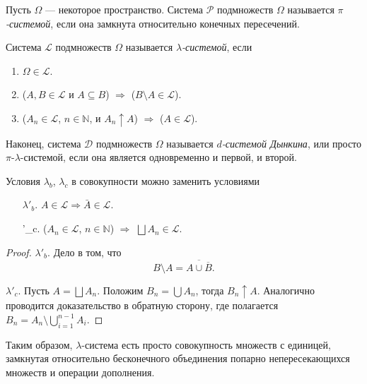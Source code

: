 \begin{definition}
  Пусть $ \Omega $ --- некоторое пространство. Система $ \mathscr P $
  подмножеств $ \Omega $ называется \emph{$ \pi $-системой}, если она замкнута
  относительно конечных пересечений.

  Система $ \mathscr L $ подмножеств $ \Omega $ называется \emph{$ \lambda
  $-системой}, если 
  \begin{enumerate}[label=$ \lambda_\alph* $.]
    \item $ \Omega \in \mathscr L $.
    \item ($ A, B \in \mathscr L $ и $ A \subseteq B $) $ \Rightarrow $ ($ B
      \setminus A \in \mathscr L$).
    \item\label{enum:lam3} ($ A_n \in \mathscr L $, $ n \in \mathbb N $, и $ A_n \uparrow A $) $
      \Rightarrow $ ($ A \in \mathscr L $).
  \end{enumerate}

  Наконец, система $ \mathscr D $ подмножеств $ \Omega $ называется \emph{$ d
  $-системой Дынкина}, или просто $ \pi $-$ \lambda $-системой, если она
  является одновременно и первой, и второй.
\end{definition}
\begin{remark*}
  Условия $ \lambda_b $, $ \lambda_c $ в совокупности можно заменить
  условиями
  \begin{enumerate}
    \item[$ \lambda'_b. $]\label{enum:lam2bis} $ A \in \mathscr L \Rightarrow \bar A\in\mathscr L $.
    \item[\lambda'_c.] ($ A_n \in \mathscr L $, $ n\in\mathbb N $) $ \Rightarrow
      $ $ \bigsqcup A_n \in \mathscr L $.
  \end{enumerate}
  \begin{proof}
  $ \lambda'_b $. Дело в том,
    что  
    \[
      B \setminus A = \overline{A\cup \overline B}.
    \]
    
    $ \lambda'_c $. Пусть $ A = \bigsqcup A_n $. Положим $ B_n = \bigcup A_n $,
    тогда $ B_n \uparrow A $. Аналогично проводится доказательство в обратную
    сторону, где полагается $ B_n = A_n \setminus \bigcup\limits_{i=1}^{n-1} A_i $.
  \end{proof}
\end{remark*}
Таким образом, $ \lambda $-система есть просто совокупность множеств с единицей,
замкнутая относительно бесконечного объединения попарно непересекающихся множеств
и операции дополнения.

